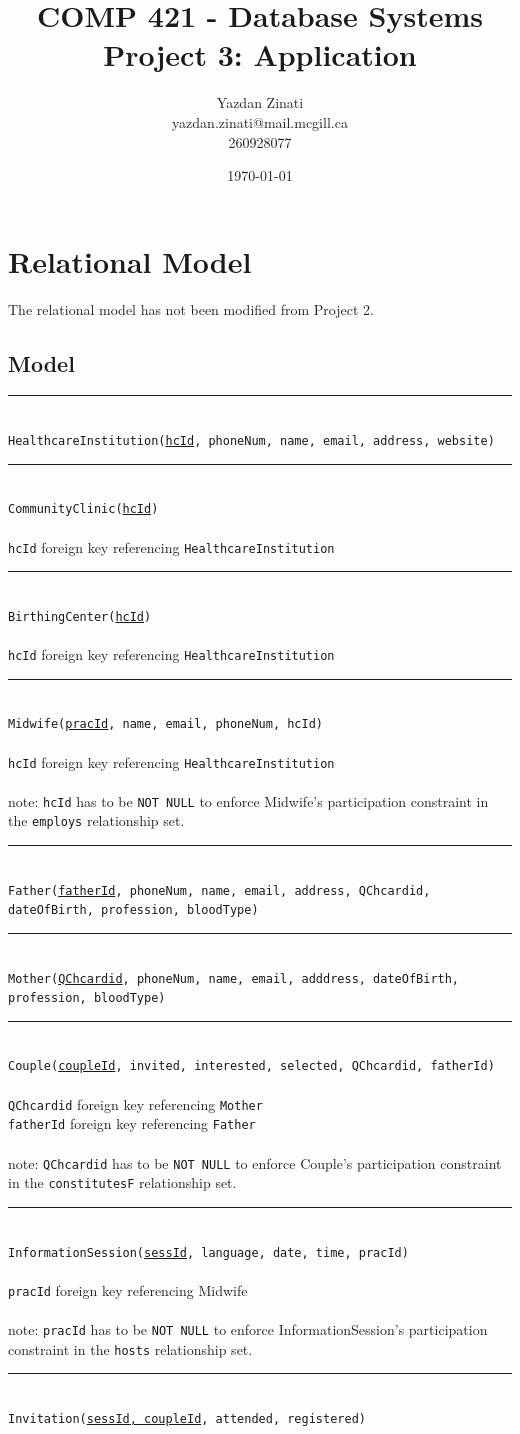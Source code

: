 \documentclass[10pt, letterpaper]{article}
\title{COMP 421 - Database Systems \\ 
\large Project 3: Application}
\author{Yazdan Zinati\\yazdan.zinati@mail.mcgill.ca\\ 260928077}
\date{\today}
\newcommand{\code}[1]{\texttt{#1}}
\newcommand{\dline}{\par\noindent\rule{\textwidth}{0.2pt}\\}
\begin{document}
\maketitle
\newpage
\section{Relational Model}
The relational model has not been modified from Project 2.
\subsection*{Model}
\dline
\code{HealthcareInstitution(\underline{hcId}, phoneNum, name, email, address, website)}
\dline
\code{CommunityClinic(\underline{hcId})}\\
\\
\code{hcId} foreign key referencing \code{HealthcareInstitution}
\dline
\code{BirthingCenter(\underline{hcId})}\\
\\
\code{hcId} foreign key referencing \code{HealthcareInstitution}
\dline
\code{Midwife(\underline{pracId}, name, email, phoneNum, hcId)}\\
\\
\code{hcId} foreign key referencing \code{HealthcareInstitution}\\
\\
note: \code{hcId} has to be \code{NOT NULL} to enforce Midwife's participation constraint in the \code{employs} relationship set.
\dline
\code{Father(\underline{fatherId}, phoneNum, name, email, address, QChcardid, dateOfBirth, profession, bloodType)}
\dline
\code{Mother(\underline{QChcardid}, phoneNum, name, email, adddress, dateOfBirth, profession, bloodType)}
\dline
\code{Couple(\underline{coupleId}, invited, interested, selected, QChcardid, fatherId)}\\
\\
\code{QChcardid} foreign key referencing \code{Mother}\\
\code{fatherId} foreign key referencing \code{Father}\\
\\
note: \code{QChcardid} has to be \code{NOT NULL} to enforce Couple's participation constraint in the \code{constitutesF} relationship set.

\dline
\code{InformationSession(\underline{sessId}, language, date, time, pracId)}\\
\\
\code{pracId} foreign key referencing Midwife\\
\\
note: \code{pracId} has to be \code{NOT NULL} to enforce InformationSession's participation constraint in the \code{hosts} relationship set.
\dline
\code{Invitation(\underline{sessId, coupleId}, attended, registered)}\\
\end{document}
